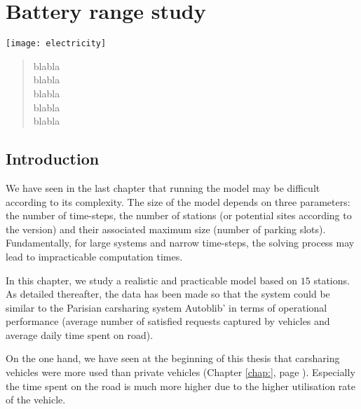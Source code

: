 \chapter{Battery range study} \label{chap:slpEnergyExp}
\begin{bibunit}[ieeetr]
\minitoc
\vspace{2cm}

\begin{minipage}[c]{.3\linewidth}
\texttt{[image: electricity]}
\end{minipage}
\hfill
\begin{minipage}[c]{.7\linewidth}
\begin{abstract}
blabla\\
blabla\\
blabla\\
blabla\\
blabla\\
\end{abstract}
\end{minipage}

\newpage
\section{Introduction}
We have seen in the last chapter that running the {\ENERGY} model may be difficult according to its complexity.
The size of the model depends on three parameters: the number of time-steps, the number of stations (or potential sites according to the version) and their associated maximum size (number of parking slots).
Fundamentally, for large systems and narrow time-steps, the solving process may lead to impracticable computation times.

\medskip
In this chapter, we study a realistic and practicable model based on $15$ stations.
As detailed thereafter, the data has been made so that the system could be similar to the Parisian carsharing system Autoblib' in terms of operational performance (average number of satisfied requests captured by vehicles and average daily time spent on road).

On the one hand, we have seen at the beginning of this thesis that carsharing vehicles were more used than private vehicles (\see Chapter \ref{chap:}, page \pageref{chap:}).
Especially the time spent on the road is much more higher due to the higher utilisation rate of the vehicle.


\end{bibunit}
